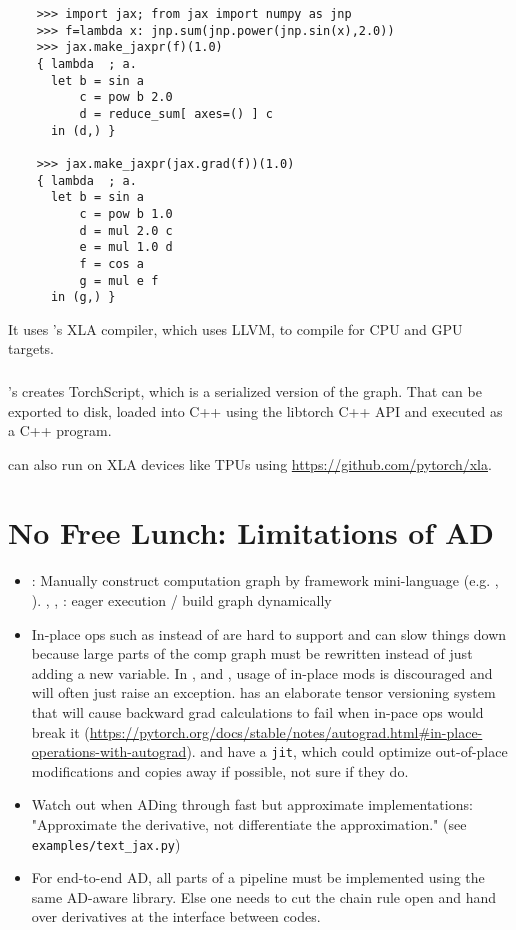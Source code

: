 \documentclass[11pt]{scrartcl}
\begin{document}
\begin{verbatim}
    >>> import jax; from jax import numpy as jnp
    >>> f=lambda x: jnp.sum(jnp.power(jnp.sin(x),2.0))
    >>> jax.make_jaxpr(f)(1.0)
    { lambda  ; a.
      let b = sin a
          c = pow b 2.0
          d = reduce_sum[ axes=() ] c
      in (d,) }

    >>> jax.make_jaxpr(jax.grad(f))(1.0)
    { lambda  ; a.
      let b = sin a
          c = pow b 1.0
          d = mul 2.0 c
          e = mul 1.0 d
          f = cos a
          g = mul e f
      in (g,) }
\end{verbatim}

It uses \tf's XLA compiler, which uses LLVM, to compile for CPU and GPU targets.

\subsubsection{\pytorch}

\pytorch's  creates TorchScript, which is a serialized version of
the graph. That can be exported to disk, loaded into C++ using the libtorch C++
API and executed as a C++ program.

\pytorch can also run on XLA devices like TPUs using
\url{https://github.com/pytorch/xla}.

\section{No Free Lunch: Limitations of AD}
\begin{itemize}
    \item \tf {}: Manually construct computation graph by framework
        mini-language (e.g. , ). \pytorch, \jax,
        \tf{}: eager execution / build graph dynamically
    \item In-place ops such as  instead of
         are hard to support and can slow things down because large
        parts of the comp graph must be rewritten instead of just adding a new
        variable. In \autograd, \jax and \pytorch, usage of in-place mods is
        discouraged and will often just raise an exception. \pytorch has an
        elaborate tensor versioning system that will cause backward grad
        calculations to fail when in-pace ops would break it
        (\url{https://pytorch.org/docs/stable/notes/autograd.html#in-place-operations-with-autograd}).
        \jax and \pytorch have a \verb|jit|, which could optimize out-of-place
        modifications and copies away if possible, not sure if they do.
    \item Watch out when ADing through fast but approximate
        implementations: "Approximate the derivative, not differentiate the
        approximation." (see \verb|examples/text_jax.py|)
    \item For end-to-end AD, all parts of a pipeline must be implemented using
        the same AD-aware library. Else one needs to cut the chain rule open
        and hand over derivatives at the interface between codes.
\end{itemize}

\newpage
\nocite{*}
\printbibliography
\end{document}
